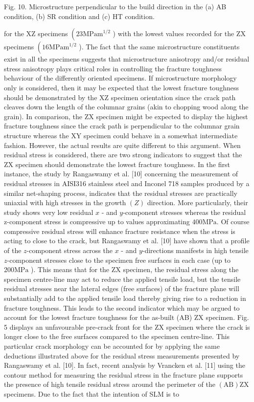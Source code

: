 \documentclass[10pt]{article}
\begin{document}
Fig. 10. Microstructure perpendicular to the build direction in the (a) AB condition, (b) SR condition and (c) HT condition.

for the $\mathrm{XZ}$ specimens $\left(23 \mathrm{MPam}^{1 / 2}\right.$ ) with the lowest values recorded for the $\mathrm{ZX}$ specimens $\left(16 \mathrm{MPam}^{1 / 2}\right.$ ). The fact that the same microstructure constituents exist in all the specimens suggests that microstructure anisotropy and/or residual stress anisotropy plays critical roles in controlling the fracture toughness behaviour of the differently oriented specimens. If microstructure morphology only is considered, then it may be expected that the lowest fracture toughness should be demonstrated by the XZ specimen orientation since the crack path cleaves down the length of the columnar grains (akin to chopping wood along the grain). In comparison, the ZX specimen might be expected to display the highest fracture toughness since the crack path is perpendicular to the columnar grain structure whereas the XY specimen could behave in a somewhat intermediate fashion. However, the actual results are quite different to this argument. When residual stress is considered, there are two strong indicators to suggest that the ZX specimen should demonstrate the lowest fracture toughness. In the first instance, the study by Rangaswamy et al. [10] concerning the measurement of residual stresses in AISI316 stainless steel and Inconel 718 samples produced by a similar net-shaping process, indicates that the residual stresses are practically uniaxial with high stresses in the growth $(Z)$ direction. More particularly, their study shows very low residual $x$ - and $y$-component stresses whereas the residual z-component stress is compressive up to values approximating $400 \mathrm{MPa}$. Of course compressive residual stress will enhance fracture resistance when the stress is acting to close to the crack, but Rangaswamy et al. [10] have shown that a profile of the $z$-component stress across the $x$ - and $y$-directions manifests in high tensile $z$-component stresses close to the specimen free surfaces in each case (up to $200 \mathrm{MPa}$ ). This means that for the ZX specimen, the residual stress along the specimen centre-line may act to reduce the applied tensile load, but the tensile residual stresses near the lateral edges (free surfaces) of the fracture plane will substantially add to the applied tensile load thereby giving rise to a reduction in fracture toughness. This leads to the second indicator which may be argued to account for the lowest fracture toughness for the as-built (AB) ZX specimen. Fig. 5 displays an unfavourable pre-crack front for the ZX specimen where the crack is longer close to the free surfaces compared to the specimen centre-line. This particular crack morphology can be accounted for by applying the same deductions illustrated above for the residual stress measurements presented by Rangaswamy et al. [10]. In fact, recent analysis by Vrancken et al. [11] using the contour method for measuring the residual stress in the fracture plane supports the presence of high tensile residual stress around the perimeter of the $(\mathrm{AB}) \mathrm{ZX}$ specimens. Due to the fact that the intention of SLM is to 
\end{document}
